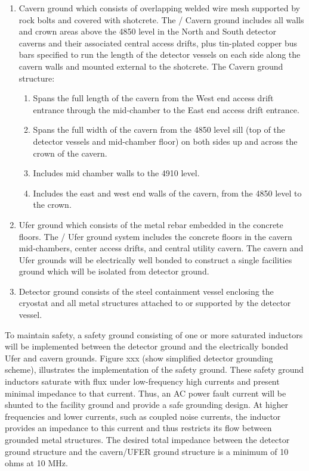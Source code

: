 \begin{enumerate}
 \item Cavern ground which consists of overlapping welded wire mesh
   supported by rock bolts and covered with shotcrete. The /
   Cavern ground includes all walls and crown areas above the 4850
   level in the North and South detector caverns and their associated
   central access drifts, plus tin-plated copper bus bars specified to
   run the length of the detector vessels on each side along the
   cavern walls and mounted external to the shotcrete.  The Cavern
   ground structure:
\begin{enumerate}
 \item Spans the full length of the cavern from the West end access
   drift entrance through the mid-chamber to the East end access drift
   entrance.
 \item Spans the full width of the cavern from the 4850 level sill
   (top of the detector vessels and mid-chamber floor) on both sides
   up and across the crown of the cavern.
 \item Includes mid chamber walls to the 4910 level.
 \item Includes the east and west end walls of the cavern, from the 4850 level to the crown.
\end{enumerate}

 \item Ufer ground which consists of the metal rebar embedded in the
   concrete floors. The / Ufer ground system includes the
   concrete floors in the cavern mid-chambers, center access drifts,
   and central utility cavern. The cavern and Ufer grounds will be
   electrically well bonded to construct a single facilities ground
   which will be isolated from detector ground.

 \item Detector ground consists of the steel containment vessel
   enclosing the cryostat and all metal structures attached to or
   supported by the detector vessel.
\end{enumerate}

To maintain safety, a safety ground consisting of one or more
saturated inductors will be implemented between the detector ground
and the electrically bonded Ufer and cavern grounds.  Figure xxx (show
simplified detector grounding scheme), illustrates the implementation
of the safety ground. These safety ground inductors saturate with flux
under low-frequency high currents and present minimal impedance to
that current.  Thus, an AC power fault current will be shunted to the
facility ground and provide a safe grounding design. At higher
frequencies and lower currents, such as coupled noise currents, the
inductor provides an impedance to this current and thus restricts its
flow between grounded metal structures. The desired total impedance
between the detector ground structure and the cavern/UFER ground
structure is a minimum of 10 ohms at 10 MHz.

